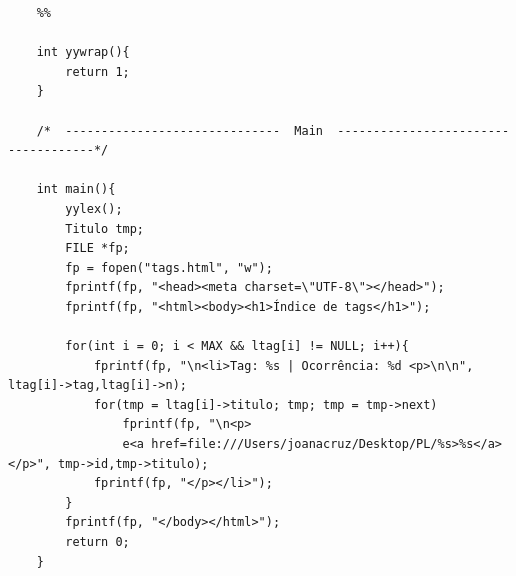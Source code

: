 \documentclass[25pt]{article}
\begin{document}
\begin{verbatim}
    %%
    
    int yywrap(){
        return 1;
    }
    
    /*  ------------------------------  Main  ------------------------------------*/
    
    int main(){
        yylex();
        Titulo tmp;
        FILE *fp;
        fp = fopen("tags.html", "w");
        fprintf(fp, "<head><meta charset=\"UTF-8\"></head>");
        fprintf(fp, "<html><body><h1>Índice de tags</h1>");
    
        for(int i = 0; i < MAX && ltag[i] != NULL; i++){
            fprintf(fp, "\n<li>Tag: %s | Ocorrência: %d <p>\n\n", ltag[i]->tag,ltag[i]->n);
            for(tmp = ltag[i]->titulo; tmp; tmp = tmp->next)
                fprintf(fp, "\n<p>
                e<a href=file:///Users/joanacruz/Desktop/PL/%s>%s</a></p>", tmp->id,tmp->titulo);
            fprintf(fp, "</p></li>");
        }
        fprintf(fp, "</body></html>");
        return 0;
    }
    \end{verbatim}
    
    
\end{document}
